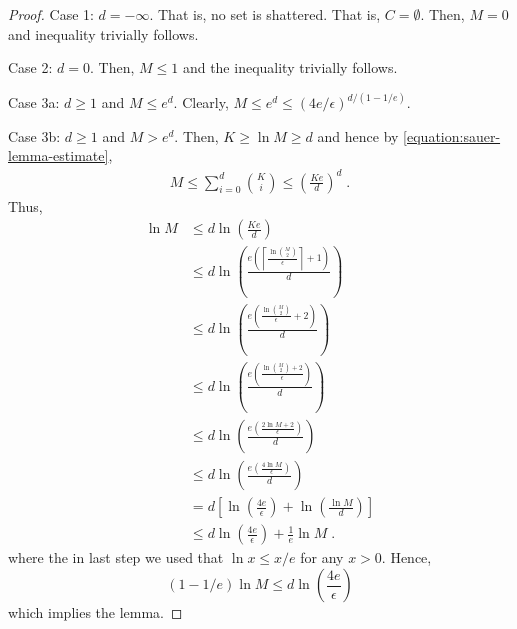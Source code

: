 \begin{proof}
Case 1: $d = -\infty$. That is, no set is shattered. That is, $C = \emptyset$.
Then, $M = 0$ and inequality trivially follows.

Case 2: $d = 0$. Then, $M \le 1$ and the inequality trivially follows.

Case 3a: $d \ge 1$ and $M \le e^d$. Clearly, $M \le e^d \le (4e/\epsilon)^{d/(1 - 1/e)}$.

Case 3b: $d \ge 1$ and $M > e^d$. Then, $K \ge \ln M \ge d$ and
hence by \eqref{equation:sauer-lemma-estimate},
\begin{align*}
M
\le \sum_{i=0}^d \binom{K}{i}
\le \left( \frac{Ke}{d} \right)^d \; .
\end{align*}
Thus,
\begin{align*}
\ln M
& \le d \ln \left( \frac{Ke}{d} \right) \\
& \le d \ln \left( \frac{e \left(\left\lceil \frac{\ln \binom{M}{2}}{\epsilon} \right\rceil + 1 \right)}{d} \right) \\
& \le d \ln \left( \frac{e \left(\frac{\ln \binom{M}{2}}{\epsilon} + 2 \right)}{d} \right) \\
& \le d \ln \left( \frac{e \left(\frac{\ln \binom{M}{2} + 2}{\epsilon} \right)}{d} \right) \\
& \le d \ln \left( \frac{e \left(\frac{2\ln M + 2}{\epsilon} \right)}{d} \right) \\
& \le d \ln \left( \frac{e \left(\frac{4\ln M}{\epsilon} \right)}{d} \right) \\
& = d \left[ \ln \left( \frac{4e}{\epsilon} \right)  + \ln \left(\frac{\ln M}{d} \right) \right] \\
& \le d \ln \left( \frac{4e}{\epsilon} \right) + \frac{1}{e} \ln M \; .
\end{align*}
where the in last step we used that $\ln x \le x/e$ for any $x > 0$.
Hence,
$$
(1 - 1/e) \ln M \le d \ln \left( \frac{4e}{\epsilon} \right)
$$
which implies the lemma.
\end{proof}
